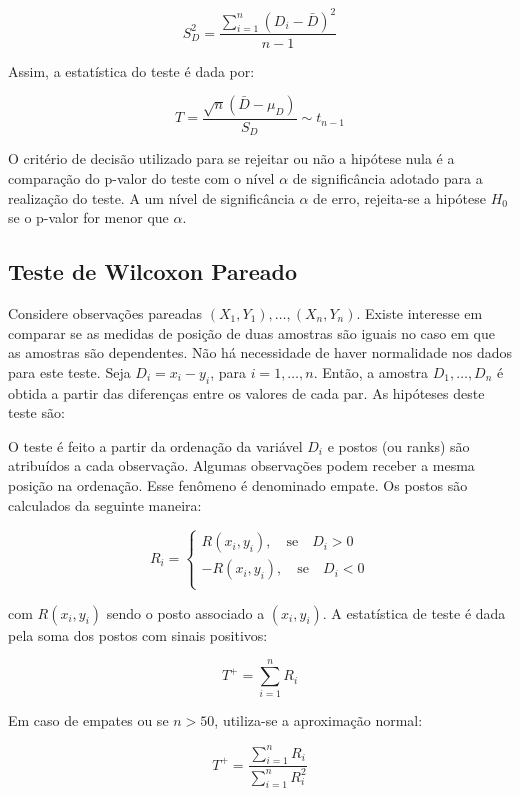 \documentclass[
]{estat/estat}
\begin{document}
\[S_D^2 = \frac{\displaystyle \sum_{i=1}^{n}(D_i - \bar{D})^2}{n - 1}\]

Assim, a estatística do teste é dada por:

\[T = \frac{\sqrt{n} \left(\bar{D} - \mu_D\right)}{S_D} \sim t_{n - 1}\]

O critério de decisão utilizado para se rejeitar ou não a hipótese nula
é a comparação do p-valor do teste com o nível \(\alpha\) de
significância adotado para a realização do teste. A um nível de
significância \(\alpha\) de erro, rejeita-se a hipótese \(H_{0}\) se o
p-valor for menor que \(\alpha\).

\subsection{Teste de Wilcoxon Pareado}\label{teste-de-wilcoxon-pareado}

Considere observações pareadas \({(X_1, Y_1), \ldots, (X_n, Y_n)}\).
Existe interesse em comparar se as medidas de posição de duas amostras
são iguais no caso em que as amostras são dependentes. Não há
necessidade de haver normalidade nos dados para este teste. Seja
\(D_i = x_i - y_i\), para \(i = 1, \ldots, n\). Então, a amostra
\(D_1, \ldots, D_n\) é obtida a partir das diferenças entre os valores
de cada par. As hipóteses deste teste são:


O teste é feito a partir da ordenação da variável \(D_i\) e postos (ou
ranks) são atribuídos a cada observação. Algumas observações podem
receber a mesma posição na ordenação. Esse fenômeno é denominado empate.
Os postos são calculados da seguinte maneira:

\[R_i =
\begin{cases}
 R(x_i, y_i), \quad \text{se} \quad D_i > 0\\ 
 -R(x_i, y_i), \quad \text{se} \quad D_i < 0\\
\end{cases}\]

com \(R(x_i, y_i)\) sendo o posto associado a \((x_i, y_i)\). A
estatística de teste é dada pela soma dos postos com sinais positivos:

\[T^+ = \displaystyle \sum_{i=1}^{n} R_i\]

Em caso de empates ou se \(n > 50\), utiliza-se a aproximação normal:

\[T^+ = \frac{\displaystyle \sum_{i=1}^{n} R_i}{\displaystyle \sum_{i=1}^{n} R^2_i}\]
\end{document}
